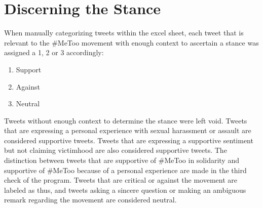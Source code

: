 \section{Discerning the Stance}

When manually categorizing tweets within the excel sheet, each tweet that is relevant to the \#MeToo movement with enough context to ascertain a stance was assigned a 1, 2 or 3 accordingly:

\begin{enumerate}
    \item Support
    \item Against
    \item Neutral
\end{enumerate}

Tweets without enough context to determine the stance were left void. Tweets that are expressing a personal experience with sexual harassment or assault are considered supportive tweets. Tweets that are expressing a supportive sentiment but not claiming victimhood are also considered supportive tweets. The distinction between tweets that are supportive of \#MeToo in solidarity and supportive of \#MeToo because of a personal experience are made in the third check of the program. Tweets that are critical or against the movement are labeled as thus, and tweets asking a sincere question or making an ambiguous remark regarding the movement are considered neutral.

